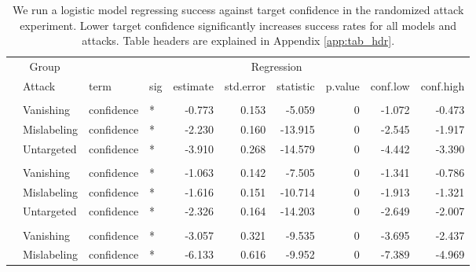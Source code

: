 \documentclass[
]{article}
\begin{document}
\begin{longtable}[t]{llllrrrrrr}
\caption{\label{tab:target_conf_table}We run a logistic model regressing success against target confidence in the randomized attack experiment. Lower target confidence significantly increases success rates for all models and attacks. Table headers are explained in Appendix \ref{app:tab_hdr}.}\\
\toprule
\multicolumn{2}{c}{Group} & \multicolumn{8}{c}{Regression} \\
\cmidrule(l{3pt}r{3pt}){1-2} \cmidrule(l{3pt}r{3pt}){3-10}
 & Attack & term & sig & estimate & std.error & statistic & p.value & conf.low & conf.high\\
\midrule
\addlinespace[0.3em]
\multicolumn{10}{l}{\textbf{YOLOv3}}\\
\hspace{1em} & Vanishing & confidence & * & -0.773 & 0.153 & -5.059 & 0 & -1.072 & -0.473\\
\cmidrule{2-10}\nopagebreak
\hspace{1em} & Mislabeling & confidence & * & -2.230 & 0.160 & -13.915 & 0 & -2.545 & -1.917\\
\cmidrule{2-10}\nopagebreak
\hspace{1em} & Untargeted & confidence & * & -3.910 & 0.268 & -14.579 & 0 & -4.442 & -3.390\\
\cmidrule{1-10}\pagebreak[0]
\addlinespace[0.3em]
\multicolumn{10}{l}{\textbf{SSD}}\\
\hspace{1em} & Vanishing & confidence & * & -1.063 & 0.142 & -7.505 & 0 & -1.341 & -0.786\\
\cmidrule{2-10}\nopagebreak
\hspace{1em} & Mislabeling & confidence & * & -1.616 & 0.151 & -10.714 & 0 & -1.913 & -1.321\\
\cmidrule{2-10}\nopagebreak
\hspace{1em} & Untargeted & confidence & * & -2.326 & 0.164 & -14.203 & 0 & -2.649 & -2.007\\
\cmidrule{1-10}\pagebreak[0]
\addlinespace[0.3em]
\multicolumn{10}{l}{\textbf{RetinaNet}}\\
\hspace{1em} & Vanishing & confidence & * & -3.057 & 0.321 & -9.535 & 0 & -3.695 & -2.437\\
\cmidrule{2-10}\nopagebreak
\hspace{1em} & Mislabeling & confidence & * & -6.133 & 0.616 & -9.952 & 0 & -7.389 & -4.969\\

\end{longtable}
\end{document}

